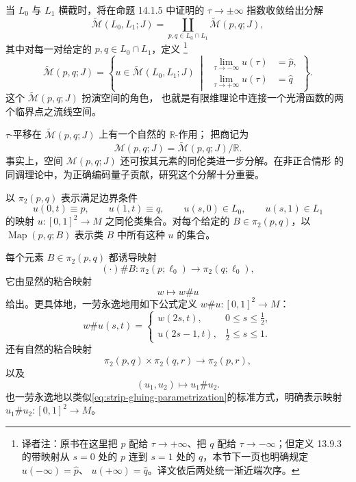 当 $L_0$ 与 $L_1$ 横截时，将在命题 14.1.5 中证明的
$\tau\to\pm\infty$ 指数收敛给出分解
\[
  \widetilde{\mathcal M}(L_0,L_1;J)
  =
  \coprod_{p,q\in L_0\cap L_1}
    \widetilde{\mathcal M}(p,q;J),
\]
其中对每一对给定的 $p,q\in L_0\cap L_1$，定义
\footnote{译者注：原书在这里把 $p$ 配给 $\tau\to+\infty$、把 $q$ 配给
$\tau\to-\infty$；但定义 13.9.3 的带映射从 $s=0$ 处的 $p$ 连到 $s=1$
处的 $q$，本节下一页也明确规定 $u(-\infty)=\widehat p$、
$u(+\infty)=\widehat q$。译文依后两处统一渐近端次序。}
\[
  \widetilde{\mathcal M}(p,q;J)
  =
  \left\{
    u\in\widetilde{\mathcal M}(L_0,L_1;J)
    \ \middle|\
    \begin{aligned}
      \lim_{\tau\to-\infty}u(\tau)&=\widehat p,\\
      \lim_{\tau\to+\infty}u(\tau)&=\widehat q
    \end{aligned}
  \right\}.
\]
这个 $\widetilde{\mathcal M}(p,q;J)$ 扮演\emph{\termConnectingOrbit{}}空间的角色，
也就是有限维\personMorse{}理论中连接一个光滑函数的两个临界点之流线空间。

$\tau$-平移在 $\widetilde{\mathcal M}(p,q;J)$ 上有一个自然的 $\mathbb R$-作用；
把商记为
\[
  \mathcal M(p,q;J)
  =
  \widetilde{\mathcal M}(p,q;J)/\mathbb R.
\]
事实上，空间 $\mathcal M(p,q;J)$ 还可按其元素的同伦类进一步分解。在非正合情形
的\personFloer{}同调理论中，为正确编码量子贡献，研究这个分解十分重要。

\begin{definition}
\label{def:strip-relative-homotopy-classes}
以 $\pi_2(p,q)$ 表示满足边界条件
\[
  u(0,t)\equiv p,
  \qquad
  u(1,t)\equiv q,
  \qquad
  u(s,0)\in L_0,
  \qquad
  u(s,1)\in L_1
\]
的映射 $u:[0,1]^2\to M$ 之同伦类集合。对每个给定的
$B\in\pi_2(p,q)$，以 $\operatorname{Map}(p,q;B)$ 表示类 $B$ 中所有这种
$u$ 的集合。
\end{definition}

每个元素 $B\in\pi_2(p,q)$ 都诱导映射
\[
  (\mathord\cdot)\#B:
  \pi_2(p;\ell_0)\longrightarrow\pi_2(q;\ell_0),
\]
它由显然的粘合映射
\[
  w\longmapsto w\#u
\]
给出。更具体地，一劳永逸地用如下公式定义
$w\#u:[0,1]^2\to M$：
\begin{equation}
  w\#u(s,t)
  =
  \begin{cases}
    w(2s,t),&0\leq s\leq\frac12,\\
    u(2s-1,t),&\frac12\leq s\leq1.
  \end{cases}
\label{eq:strip-gluing-parametrization}
\end{equation}
还有自然的粘合映射
\[
  \pi_2(p,q)\times\pi_2(q,r)
  \longrightarrow\pi_2(p,r),
\]
以及
\[
  (u_1,u_2)\longmapsto u_1\#u_2.
\]
也一劳永逸地以类似\eqref{eq:strip-gluing-parametrization}的标准方式，明确表示映射
$u_1\#u_2:[0,1]^2\to M$。

